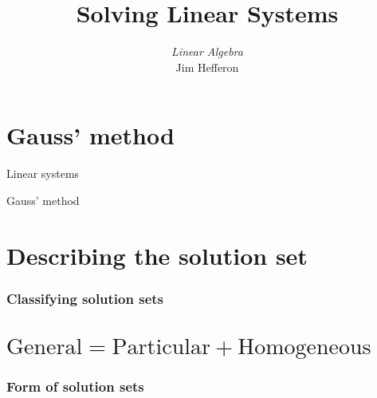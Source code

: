 \documentclass[10pt,t,serif,professionalfont]{beamer}
\title[Solving Linear Systems] %
{Solving Linear Systems}
\author{\textit{Linear Algebra} \\ {\small Jim Hef{}feron}}
\institute{
  \texttt{http://joshua.smcvt.edu/linearalgebra}
}
\date{}
\begin{document}
\begin{frame}
  \titlepage
\end{frame}




\section{Gauss' method}
\begin{frame}{Linear systems} 
\df[df:linearcombination]
\end{frame}


\begin{frame}
\df[df:linearcombination]
  
\end{frame}



\begin{frame}{Gauss' method}
\th[th:GaussMethod]

\end{frame}



\begin{frame}
\pf[th:GaussMethod]
\df[df:GaussMethod]

\end{frame}








\section{Describing the solution set}
\begin{frame}
\frametitle{Classifying solution sets} 

\end{frame}



\section{$\text{General}=\text{Particular}+\text{Homogeneous}$}
\begin{frame}
\frametitle{Form of solution sets} 

\end{frame}








% 
\end{document}
